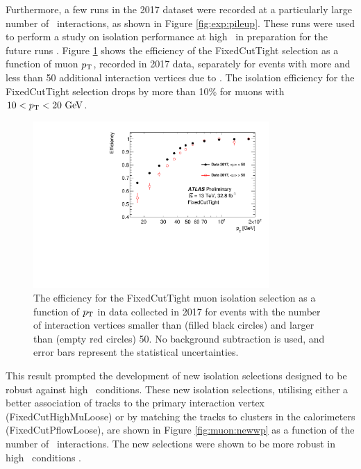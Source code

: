 Furthermore, a few runs in the 2017 dataset were recorded at a particularly large
number of \pileup~interactions, as shown in Figure \ref{fig:exp:pileup}.
These runs were used to perform a study on isolation performance at high
\pileup~in preparation for the future runs \cite{Kohler:2293040}.
Figure \ref{fig:muon:highmu} shows the efficiency of the FixedCutTight
selection as a function of muon $p_{\text{T}}$, recorded in 2017 data, separately
for events with more and less than 50 additional interaction vertices
due to \pileup. The  isolation efficiency for the FixedCutTight
selection drops by more than 10\% for muons with $10 < p_{\text{T}} < 20~\text{Ge\kern -0.1em V}$.
\begin{figure}[h!]
  \centering
  \includegraphics[width=0.8\textwidth]{figures/muons/highmu}
  \caption[Muon isolation efficiency at high \pileup]{The efficiency
  for the FixedCutTight muon isolation selection as a function of $p_{\text{T}}$
  in data collected in 2017 for events with the number of interaction vertices smaller
  than (filled black circles) and larger than (empty red circles) 50.
  No background subtraction is used, and error bars represent
  the statistical uncertainties.
  }
  \label{fig:muon:highmu}
\end{figure}
This result prompted the development of new isolation selections
designed to be robust against high \pileup~conditions. These new
isolation selections, utilising either a better association of tracks
to the primary interaction vertex (FixedCutHighMuLoose) or by matching
the tracks to clusters in the calorimeters (FixedCutPflowLoose), 
are shown in Figure \ref{fig:muon:newwp} as a function of the number
of \pileup~interactions. The new selections were shown to be more
robust in high \pileup~conditions \cite{Zgubic:2320874}.
